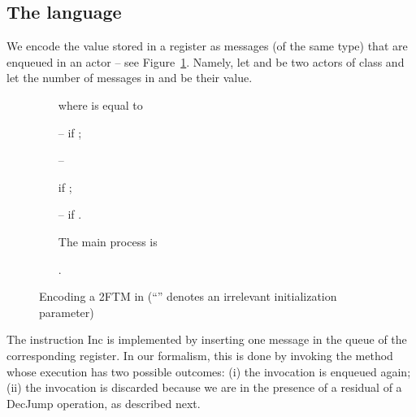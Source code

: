 \documentclass{LMCS}
\theoremstyle{plain}\newtheorem{proposition}[thm]{Proposition}
\theoremstyle{plain}\newtheorem{lemma}[thm]{Lemma}
\theoremstyle{plain}\newtheorem{theorem}[thm]{Theorem}
\theoremstyle{plain}\newtheorem{corollary}[thm]{Corollary}
\newif\iftype \typefalse
\newcommand{\actba}{}
\begin{document}
\subsection{The language {\actba}}
\label{ssec.finiteactors}


We encode the value  stored in a register as 
 messages (of the same type) that are enqueued in an actor -- see 
Figure~\ref{fig:2CM_actor}. 
Namely, let  and  be two actors of class  and let 
the number of messages  in  and  be 
their value. 
\begin{figure}[t]
 \iftype
 \begin{lstlisting}[frame=single]
 actor  {
 	fields { dec }
 	method one() =  dec    ( [dec = ]   one())
 	method inc(pc) =   one()  Ctrl  run(pc)
 	method decJump(pc, pc') = 
 		dec      checkZero(pc, pc')
 	method checkZero(pc, pc') =
 		[dec = ] Ctrl  run(pc')  Ctrl  run(pc)
 	method init() = dec  
 }
 actor Ctrl {
 	method run(pc) =
 		[pc = 1]  
 		. . . 
 		[pc = n]   
 	method init() =   init()    init()  Ctrl  run(1)
 }
 \end{lstlisting}
 \else


\bigskip

\begin{itemize}
\item[] \hspace{-1.2cm}
\quad \quad where  is equal to

\medskip
 \item[--]
 \qquad if 
 ;
 \item[--]
 
 \qquad if 
 ;
 \item[--]
 \qquad if 
 .
 \end{itemize}

\bigskip
 
\begin{itemize}
\item[]
\hspace{-1.2cm}
\quad\quad
The main process is 

\medskip

  .
\end{itemize}
 \fi
 \caption{Encoding a 2FTM in {\actba} (``'' denotes an irrelevant initialization
 parameter)}\label{fig:2CM_actor}
 \end{figure}



The instruction {\sf Inc} is  implemented by inserting 
one    message in the queue of the corresponding register. 
In our formalism, this is done by invoking the method 
 whose execution has two possible outcomes: (i) 
the invocation is enqueued again; (ii) the invocation is discarded because
we are in the presence of a residual of a {\sf DecJump} operation, as described next.
\end{document}
